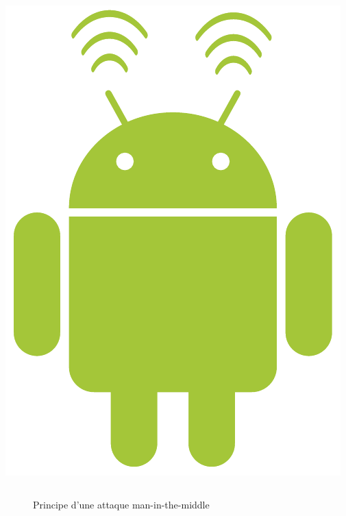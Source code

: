 \documentclass[aspectratio=1610, handout]{beamer}%
\begin{document}
\begin{frame}[t]
\begin{columns}
\begin{column}{0.25\linewidth}
      \includegraphics[width=0.75\linewidth]{img/android_network.pdf}
    \end{column}
  \end{columns}
  \vfill
\end{frame}

\begin{frame}[t]
  \slidetitle[Principe]
  \begin{figure}
    \vspace{-0.65cm}
    
    \caption{Principe d'une attaque man-in-the-middle}
  \end{figure}
\end{frame}
\end{document}
